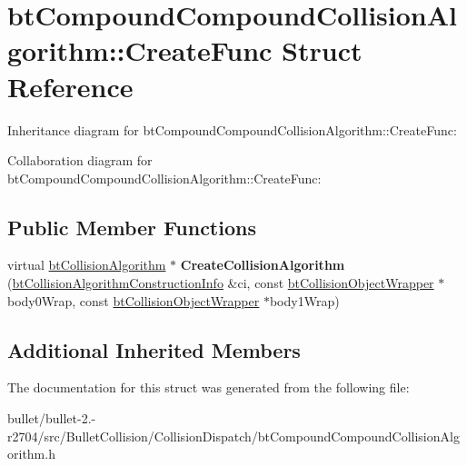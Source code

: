 \hypertarget{structbt_compound_compound_collision_algorithm_1_1_create_func}{\section{bt\+Compound\+Compound\+Collision\+Algorithm\+:\+:Create\+Func Struct Reference}
\label{structbt_compound_compound_collision_algorithm_1_1_create_func}
}


Inheritance diagram for bt\+Compound\+Compound\+Collision\+Algorithm\+:\+:Create\+Func\+:


Collaboration diagram for bt\+Compound\+Compound\+Collision\+Algorithm\+:\+:Create\+Func\+:
\subsection*{Public Member Functions}
\begin{DoxyCompactItemize}
\item 
\hypertarget{structbt_compound_compound_collision_algorithm_1_1_create_func_a8724054795b9fbc789fea71981e578fe}{virtual \hyperlink{classbt_collision_algorithm}{bt\+Collision\+Algorithm} $\ast$ {\bfseries Create\+Collision\+Algorithm} (\hyperlink{structbt_collision_algorithm_construction_info}{bt\+Collision\+Algorithm\+Construction\+Info} \&ci, const \hyperlink{structbt_collision_object_wrapper}{bt\+Collision\+Object\+Wrapper} $\ast$body0\+Wrap, const \hyperlink{structbt_collision_object_wrapper}{bt\+Collision\+Object\+Wrapper} $\ast$body1\+Wrap)}\label{structbt_compound_compound_collision_algorithm_1_1_create_func_a8724054795b9fbc789fea71981e578fe}

\end{DoxyCompactItemize}
\subsection*{Additional Inherited Members}


The documentation for this struct was generated from the following file\+:\begin{DoxyCompactItemize}
\item 
bullet/bullet-\/2.-\/r2704/src/\+Bullet\+Collision/\+Collision\+Dispatch/bt\+Compound\+Compound\+Collision\+Algorithm.\+h\end{DoxyCompactItemize}
